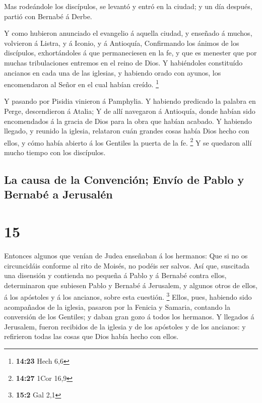  Mas rodeándole los discípulos, se levantó y entró en la
ciudad; y un día después, partió con Bernabé á Derbe.

 Y como hubieron anunciado el evangelio á aquella ciudad,
y enseñado á muchos, volvieron á Listra, y á Iconio, y á Antioquía,
 Confirmando los ánimos de los discípulos, exhortándoles
á que permaneciesen en la fe, y que es menester que por muchas
tribulaciones entremos en el reino de Dios.  Y
habiéndoles constituído ancianos en cada una de las iglesias, y habiendo
orado con ayunos, los encomendaron al Señor en el cual habían creído.
\footnote{\textbf{14:23} Hech 6,6}

 Y pasando por Pisidia vinieron á Pamphylia.
 Y habiendo predicado la palabra en Perge, descendieron á
Atalia;  Y de allí navegaron á Antioquía, donde habían
sido encomendados á la gracia de Dios para la obra que habían acabado.
 Y habiendo llegado, y reunido la iglesia, relataron cuán
grandes cosas había Dios hecho con ellos, y cómo había abierto á los
Gentiles la puerta de la fe. \footnote{\textbf{14:27} 1Cor 16,9}
 Y se quedaron allí mucho tiempo con los discípulos.

\hypertarget{la-causa-de-la-convenciuxf3n-envuxedo-de-pablo-y-bernabuxe9-a-jerusaluxe9n}{%
\subsection{La causa de la Convención; Envío de Pablo y Bernabé a
Jerusalén}\label{la-causa-de-la-convenciuxf3n-envuxedo-de-pablo-y-bernabuxe9-a-jerusaluxe9n}}

\hypertarget{section-14}{%
\section{15}\label{section-14}}

 Entonces algunos que venían de Judea enseñaban á los
hermanos: Que si no os circuncidáis conforme al rito de Moisés, no
podéis ser salvos.  Así que, suscitada una disensión y
contienda no pequeña á Pablo y á Bernabé contra ellos, determinaron que
subiesen Pablo y Bernabé á Jerusalem, y algunos otros de ellos, á los
apóstoles y á los ancianos, sobre esta cuestión. \footnote{\textbf{15:2}
  Gal 2,1}  Ellos, pues, habiendo sido acompañados de la
iglesia, pasaron por la Fenicia y Samaria, contando la conversión de los
Gentiles; y daban gran gozo á todos los hermanos.  Y
llegados á Jerusalem, fueron recibidos de la iglesia y de los apóstoles
y de los ancianos: y refirieron todas las cosas que Dios había hecho con
ellos.

